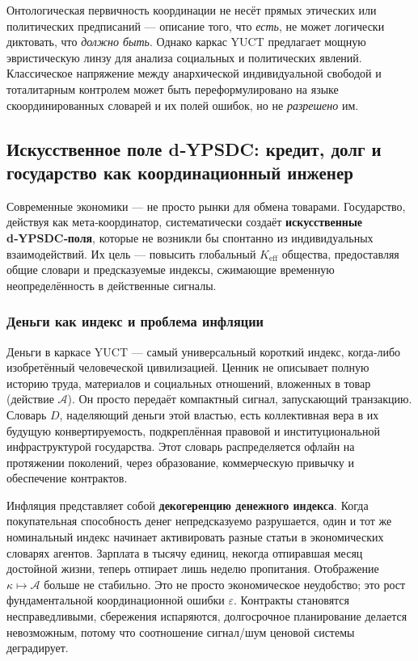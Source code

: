 \documentclass[12pt,a4paper]{article}
\begin{document}
	Онтологическая первичность координации не несёт прямых этических или политических предписаний — описание того, что \emph{есть}, не может логически диктовать, что \emph{должно быть}. Однако каркас YUCT предлагает мощную эвристическую линзу для анализа социальных и политических явлений. Классическое напряжение между анархической индивидуальной свободой и тоталитарным контролем может быть переформулировано на языке скоординированных словарей и их полей ошибок, но не \emph{разрешено} им.
	
	\subsection{Искусственное поле d‑YPSDC: кредит, долг и государство как координационный инженер}
	
	Современные экономики — не просто рынки для обмена товарами. Государство, действуя как мета‑координатор, систематически создаёт \textbf{искусственные d‑YPSDC‑поля}, которые не возникли бы спонтанно из индивидуальных взаимодействий. Их цель — повысить глобальный \(K_{\mathrm{eff}}\) общества, предоставляя общие словари и предсказуемые индексы, сжимающие временную неопределённость в действенные сигналы.
	
	\subsubsection{Деньги как индекс и проблема инфляции}
	
	Деньги в каркасе YUCT — самый универсальный короткий индекс, когда‑либо изобретённый человеческой цивилизацией. Ценник не описывает полную историю труда, материалов и социальных отношений, вложенных в товар (действие \(\mathcal{A}\)). Он просто передаёт компактный сигнал, запускающий транзакцию. Словарь \(D\), наделяющий деньги этой властью, есть коллективная вера в их будущую конвертируемость, подкреплённая правовой и институциональной инфраструктурой государства. Этот словарь распределяется офлайн на протяжении поколений, через образование, коммерческую привычку и обеспечение контрактов.
	
	Инфляция представляет собой \textbf{декогеренцию денежного индекса}. Когда покупательная способность денег непредсказуемо разрушается, один и тот же номинальный индекс начинает активировать разные статьи в экономических словарях агентов. Зарплата в тысячу единиц, некогда отпиравшая месяц достойной жизни, теперь отпирает лишь неделю пропитания. Отображение \(\kappa \mapsto \mathcal{A}\) больше не стабильно. Это не просто экономическое неудобство; это рост фундаментальной координационной ошибки \(\varepsilon\). Контракты становятся несправедливыми, сбережения испаряются, долгосрочное планирование делается невозможным, потому что соотношение сигнал/шум ценовой системы деградирует.
	
\end{document}
